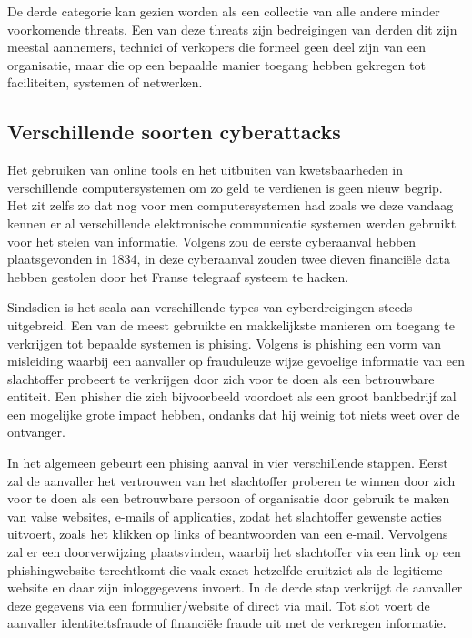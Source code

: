 De derde categorie kan gezien worden als een collectie van alle andere minder voorkomende threats. Een van deze threats zijn bedreigingen van derden dit zijn meestal aannemers, technici of verkopers die formeel geen deel zijn van een organisatie, maar die op een bepaalde manier toegang hebben gekregen tot faciliteiten, systemen of netwerken. \autocite{Cisa2025}



\subsection{Verschillende soorten cyberattacks}
Het gebruiken van online tools en het uitbuiten van kwetsbaarheden in verschillende computersystemen om zo geld te verdienen is geen nieuw begrip. Het zit zelfs zo dat nog voor men computersystemen had zoals we deze vandaag kennen er al verschillende elektronische communicatie systemen werden gebruikt voor het stelen van informatie. Volgens \textcite{Monroe2025} zou de eerste cyberaanval hebben plaatsgevonden in 1834, in deze cyberaanval zouden twee dieven financiële data hebben gestolen door het Franse telegraaf systeem te hacken. 

Sindsdien is het scala aan verschillende types van cyberdreigingen steeds uitgebreid. Een van de meest gebruikte en makkelijkste manieren om toegang te verkrijgen tot bepaalde systemen is phising. Volgens \textcite{jagatic2007} is phishing een vorm van misleiding waarbij een aanvaller op frauduleuze wijze gevoelige informatie van een slachtoffer probeert te verkrijgen door zich voor te doen als een betrouwbare entiteit. Een phisher die zich bijvoorbeeld voordoet als een groot bankbedrijf zal een mogelijke grote impact hebben, ondanks dat hij weinig tot niets weet over de ontvanger. 

In het algemeen gebeurt een phising aanval in vier verschillende stappen. Eerst zal de aanvaller het vertrouwen van het slachtoffer proberen te winnen door zich voor te doen als een betrouwbare persoon of organisatie door gebruik te maken van valse websites, e-mails of applicaties, zodat het slachtoffer gewenste acties uitvoert, zoals het klikken op links of beantwoorden van een e-mail. Vervolgens zal er een doorverwijzing plaatsvinden, waarbij het slachtoffer via een link op een phishingwebsite terechtkomt die vaak exact hetzelfde eruitziet als de legitieme website en daar zijn inloggegevens invoert. In de derde stap verkrijgt de aanvaller deze gegevens via een formulier/website of direct via mail. Tot slot voert de aanvaller identiteitsfraude of financiële fraude uit met de verkregen informatie. \autocite{varshney2024}

